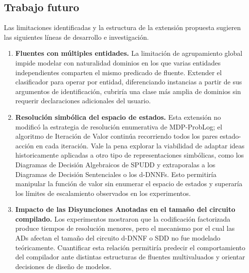 \clearpage

\subsection{Trabajo futuro}
\label{sec:conclusiones-futuro}

Las limitaciones identificadas y la estructura de la extensión propuesta
sugieren las siguientes líneas de desarrollo e investigación.

\begin{enumerate}
    \item \textbf{Fluentes con múltiples entidades.} La limitación de
    agrupamiento global impide modelar con naturalidad dominios en los que
    varias entidades independientes comparten el mismo predicado de fluente.
    Extender el clasificador para operar por entidad, diferenciando
    instancias a partir de sus argumentos de identificación, cubriría una
    clase más amplia de dominios sin requerir declaraciones adicionales del
    usuario.

    \item \textbf{Resolución simbólica del espacio de estados.} Esta
    extensión no modificó la estrategia de resolución enumerativa de
    MDP-ProbLog; el algoritmo de Iteración de Valor continúa recorriendo
    todos los pares estado-acción en cada iteración. Vale la pena explorar la
    viabilidad de adaptar ideas historicamente aplicadas a otro tipo de representaciones
    simbólicas, como los Diagramas de Decisión Algebraicos de SPUDD \cite{hoey1999spudd}
    y extraporalas a los Diagramas de Decisión Sentenciales o los d-DNNFs. 
    Esto permitiría manipular la función de valor sin
    enumerar el espacio de estados y superaría los límites de escalamiento
    observados en los experimentos.

    \item \textbf{Impacto de las Disyunciones Anotadas en el tamaño del
    circuito compilado.} Los experimentos mostraron que la codificación
    factorizada produce tiempos de resolución menores, pero el mecanismo por
    el cual las ADs afectan el tamaño del circuito d-DNNF o SDD no fue
    modelado teóricamente. Cuantificar esta relación permitiría predecir el
    comportamiento del compilador ante distintas estructuras de fluentes
    multivaluados y orientar decisiones de diseño de modelos.
\end{enumerate}
